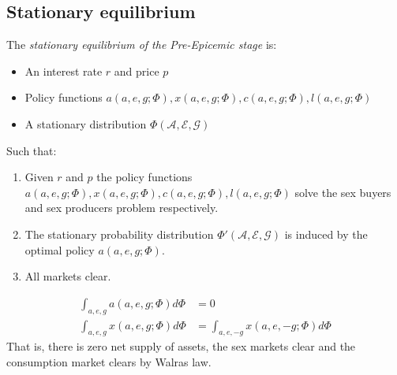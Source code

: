  \subsection*{Stationary equilibrium}
 The \textit{stationary equilibrium of the Pre-Epicemic stage} is:
 \begin{itemize}
 \item An interest rate $r$ and price $p$
 \item Policy functions $a(a,e,g;\Phi), x(a,e,g;\Phi), c(a,e,g;\Phi), l(a,e,g;\Phi)$
 \item A stationary distribution $\Phi(\mathcal{A},\mathcal{E},\mathcal{G}) $
 \end{itemize}
 Such that:
 \begin{enumerate}[label=\alph*]
 \item Given $r$ and $p$ the policy functions  $a(a,e,g;\Phi), x(a,e,g;\Phi), c(a,e,g;\Phi), l(a,e,g;\Phi)$ solve the sex buyers and sex producers problem respectively. 
 \item The stationary probability distribution $\Phi'(\mathcal{A},\mathcal{E},\mathcal{G})$ is induced by the optimal policy $a(a,e,g;\Phi)$.
 \item All markets clear. 
  \end{enumerate}
 \begin{align*}
\int_{a,e,g} a(a,e,g;\Phi) d\Phi &= 0 \\
\int_{a,e,g} x(a,e,g;\Phi) d \Phi &= \int_{a,e,-g} x(a,e,-g;\Phi) d\Phi
\end{align*} 
That is, there is zero net supply of assets, the sex markets clear and the consumption market clears by Walras law. 

 
 


